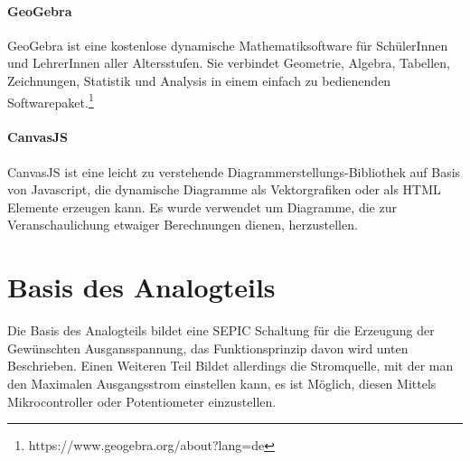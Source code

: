\documentclass[paper=a4, 12pt]{scrreprt}
\begin{document}
	\paragraph{GeoGebra}\hfill \break
	GeoGebra ist eine kostenlose dynamische Mathematiksoftware für SchülerInnen und LehrerInnen aller Altersstufen. Sie verbindet Geometrie, Algebra, Tabellen, Zeichnungen, Statistik und Analysis in einem einfach zu bedienenden Softwarepaket.\footnote{https://www.geogebra.org/about?lang=de}
	\paragraph{CanvasJS}\hfill \break
	CanvasJS ist eine leicht zu verstehende Diagrammerstellungs-Bibliothek auf Basis von Javascript, die dynamische Diagramme als Vektorgrafiken oder als HTML Elemente erzeugen kann. Es wurde verwendet um Diagramme, die zur Veranschaulichung etwaiger Berechnungen dienen, herzustellen.
	\newpage
	
	\section{Basis des Analogteils}
	Die Basis des Analogteils bildet eine SEPIC Schaltung für die Erzeugung der Gewünschten Ausgansspannung, das Funktionsprinzip davon wird unten Beschrieben. Einen Weiteren Teil Bildet allerdings die Stromquelle, mit der man den Maximalen Ausgangsstrom einstellen kann, es ist Möglich, diesen Mittels Mikrocontroller oder Potentiometer einzustellen.
\end{document}
